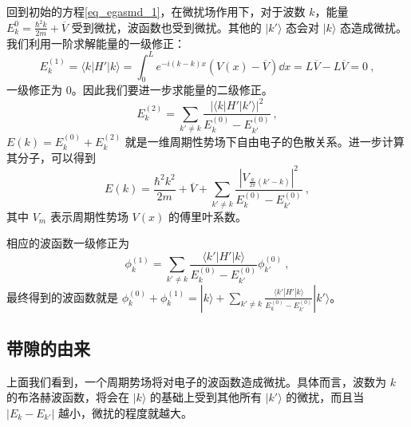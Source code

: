 回到初始的方程\autoref{eq_egasmd_1}，在微扰场作用下，对于波数 $k$，能量 $E_k^{0}=\frac{\hbar^2 k}{2m}+\overline V$ 受到微扰，波函数也受到微扰。其他的 $|k'\rangle$ 态会对 $|k\rangle$ 态造成微扰。我们利用一阶求解能量的一级修正：
\begin{equation}
E_k^{(1)}=\langle k|H'|k\rangle=\int_0^L e^{-i(k-k)x}(V(x)-\overline V)\dd x=L\overline V-L\overline V=0~,
\end{equation}
一级修正为 $0$。因此我们要进一步求能量的二级修正。
\begin{equation}
E_k^{(2)}=\sum_{k'\neq k}\frac{|\langle k|H'|k'\rangle|^2}{E_k^{(0)}-E_{k'}^{(0)}}~,
\end{equation}
$E(k)=E_k^{(0)}+E_k^{(2)}$ 就是一维周期性势场下自由电子的色散关系。进一步计算其分子，可以得到
\begin{equation}
E(k)=\frac{\hbar^2 k^2}{2m}+\overline V+\sum_{k'\neq k} \frac{|V_{\frac{a}{2\pi}(k'-k)}|^2}{E_k^{(0)}-E_{k'}^{(0)}}~,
\end{equation}
其中 $V_m$ 表示周期性势场 $V(x)$ 的傅里叶系数。

相应的波函数一级修正为
\begin{equation}
\phi_k^{(1)}=\sum_{k'\neq k}\frac{\langle k'|H'|k\rangle}{E_k^{(0)}-E_{k'}^{(0)}} \phi_{k'}^{(0)}~,
\end{equation}
最终得到的波函数就是 $\phi_k^{(0)}+\phi_k^{(1)}=|k\rangle+\sum_{k'\neq k}\frac{\langle k'|H'|k\rangle}{E_k^{(0)}-E_{k'}^{(0)}} |k'\rangle$。
\subsection{带隙的由来}
上面我们看到，一个周期势场将对电子的波函数造成微扰。具体而言，波数为 $k$ 的布洛赫波函数，将会在 $|k\rangle$ 的基础上受到其他所有 $|k'\rangle$ 的微扰，而且当 $|E_k-E_{k'}|$ 越小，微扰的程度就越大。

